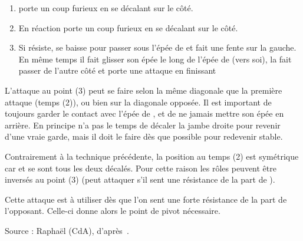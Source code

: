 \begin{technique}[Abnemmen]
\label{épée-longue:tech:abnemmen}

\begin{enumerate}
	\item \A porte un coup furieux en se décalant sur le côté.
	
	\item En réaction \D porte un coup furieux en se décalant sur le côté.
	
	\item Si \A résiste, \D se baisse pour passer sous l'épée de \A et fait une fente sur la gauche.
	En même temps il fait glisser son épée le long de l'épée de \A (vers soi), la fait passer de l'autre côté et porte une attaque en finissant 
\end{enumerate}

L'attaque au point (3) peut se faire selon la même diagonale que la première attaque (temps (2)), ou bien sur la diagonale opposée.
Il est important de toujours garder le contact avec l'épée de \A, et de ne jamais mettre son épée en arrière.
En principe \D n'a pas le temps de décaler la jambe droite pour revenir d'une vraie garde, mais il doit le faire dès que possible pour redevenir stable.

Contrairement à la technique précédente, la position au temps (2) est symétrique car \A et \D se sont tous les deux décalés.
Pour cette raison les rôles peuvent être inversés au point (3) (\A peut attaquer s'il sent une résistance de la part de \D).

Cette attaque est à utiliser dès que l'on sent une forte résistance de la part de l'opposant.
Celle-ci donne alors le point de pivot nécessaire.

Source : Raphaël (CdA), d'après~\cite[fol.~19r-20v, §2, p.~16]{farrell:ringeck}.
\end{technique}


